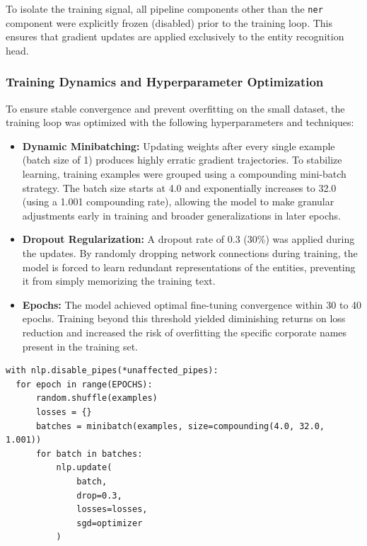 \documentclass[twoside,final]{hcmut-report}
\begin{document}
To isolate the training signal, all pipeline components other than the \texttt{ner} component were explicitly frozen (disabled) prior to the training loop. This ensures that gradient updates are applied exclusively to the entity recognition head.

\subsubsection*{Training Dynamics and Hyperparameter Optimization}
To ensure stable convergence and prevent overfitting on the small dataset, the training loop was optimized with the following hyperparameters and techniques:

\begin{itemize}
  \item \textbf{Dynamic Minibatching:} Updating weights after every single example (batch size of 1) produces highly erratic gradient trajectories. To stabilize learning, training examples were grouped using a compounding mini-batch strategy. The batch size starts at 4.0 and exponentially increases to 32.0 (using a 1.001 compounding rate), allowing the model to make granular adjustments early in training and broader generalizations in later epochs.
  \item \textbf{Dropout Regularization:} A dropout rate of 0.3 (30\%) was applied during the updates. By randomly dropping network connections during training, the model is forced to learn redundant representations of the entities, preventing it from simply memorizing the training text.
  \item \textbf{Epochs:} The model achieved optimal fine-tuning convergence within 30 to 40 epochs. Training beyond this threshold yielded diminishing returns on loss reduction and increased the risk of overfitting the specific corporate names present in the training set.
\end{itemize}

\begin{verbatim}
with nlp.disable_pipes(*unaffected_pipes):
  for epoch in range(EPOCHS):
      random.shuffle(examples)
      losses = {}
      batches = minibatch(examples, size=compounding(4.0, 32.0, 1.001))
      for batch in batches:
          nlp.update(
              batch,
              drop=0.3,
              losses=losses,
              sgd=optimizer
          )
\end{verbatim}
\end{document}
